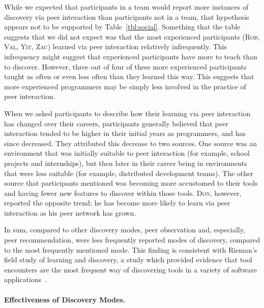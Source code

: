 \documentclass[smallextended]{svjour3}
\newcommand\discovery{peer interaction\xspace}
\newcommand\discpush{peer recommendation\xspace}
\newcommand\discpull{peer observation\xspace}
\newcommand\context{mode\xspace}
\newcommand\contexts{modes\xspace}
\newcommand\Contexts{Modes\xspace}
\newcommand{\subject}[1]{\textsc{#1}}
\newcommand{\asub}{{\subject{Zac}}\xspace}
\newcommand{\bsub}{{\subject{Rob}}\xspace}
\newcommand{\esub}{{\subject{Val}}\xspace}
\newcommand{\jsub}{{\subject{Yit}}\xspace}
\newcommand{\msub}{{\subject{Don}}\xspace}
\begin{document}
While we expected that participants in a team would report more instances of
discovery via \discovery than participants not in a team, that hypothesis appears
not to be supported by Table~\ref{tbl:social}.
Something that the table suggests that we did not expect was
that the most experienced participants (\bsub, \esub, \jsub, \asub) learned via
\discovery relatively infrequently.
This infrequency might suggest that experienced participants have more to teach than
to discover.
However, three out of four of these more experienced participants taught as often
or even less often than they learned this way.
This suggests that more
experienced programmers may be simply less involved in the practice of \discovery.


When we asked participants to describe how their learning via \discovery has
changed over their careers, participants generally believed that \discovery tended
to be higher in their initial years as programmers, and has since decreased.
They attributed this decrease to two sources.
One source was an environment that was initially suitable to \discovery
(for example, school projects and internships), but then later in
their career being in environments that were less suitable (for example,
distributed development teams).
The other source that participants mentioned was becoming more accustomed to
their tools and having fewer new features to discover within those tools. 
\msub, however, reported the opposite trend; he has become more
likely to learn via \discovery as his peer network has grown.


In sum, compared to other discovery \contexts, \discpull and,
especially, \discpush, were less frequently reported \contexts of discovery,
compared to the most frequently mentioned \context.
This finding is consistent with Rieman's field study of
learning and discovery, a study which provided evidence that 
tool encounters are the most frequent way of discovering tools 
in a variety of software applications~\citep{rieman}.

\paragraph{Effectiveness of Discovery \Contexts.}\label{sec:effective}
\end{document}
